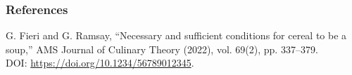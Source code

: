 \documentclass{beamer}
\theoremstyle{definition}
\theoremstyle{remark}
\begin{document}
\begin{frame}
	\frametitle{References}

	{\footnotesize
	\begin{thebibliography}{99}

	G. Fieri and G. Ramsay,
	``Necessary and sufficient conditions for cereal to be a soup,''
	AMS Journal of Culinary Theory (2022), vol. 69(2), pp. 337--379.
	\\DOI: \url{https://doi.org/10.1234/56789012345}.

	\end{thebibliography}
	}

\end{frame}
\end{document}
